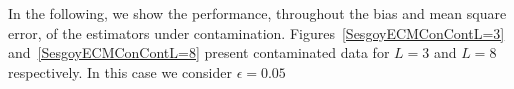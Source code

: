 \documentclass[twocolumn]{svjour3}
\begin{document}
	In the following, we show the performance, throughout the bias and mean square error, of the estimators under contamination. 
	Figures~\ref{SesgoyECMConContL=3} and~\ref{SesgoyECMConContL=8} present contaminated data for $L=3$ and $L=8$ respectively. In this case we consider $\epsilon=0.05$
	
\end{document}
